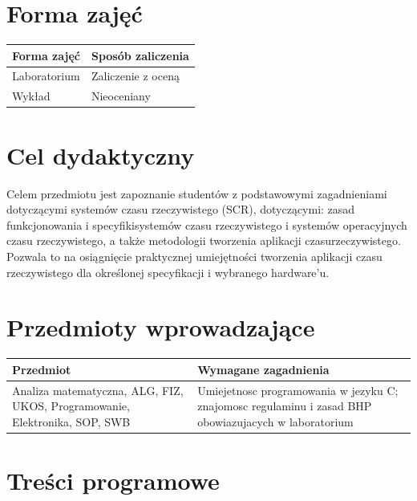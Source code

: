 \documentclass[12pt, a4paper]{article}
\begin{document}
\section{Forma zajęć}

\begin{tabular}{ll}
  \hline
  \textbf{Forma zajęć} & \textbf{Sposób zaliczenia} \\
  \hline
  Laboratorium & Zaliczenie z oceną \\
  Wykład & Nieoceniany \\
  \hline
\end{tabular}

\section{Cel dydaktyczny}

Celem przedmiotu jest zapoznanie studentów z podstawowymi zagadnieniami dotyczącymi systemów czasu rzeczywistego (SCR), dotyczącymi: zasad funkcjonowania i specyfikisystemów czasu rzeczywistego i systemów operacyjnych czasu rzeczywistego, a także metodologii tworzenia aplikacji czasurzeczywistego. Pozwala to na osiągnięcie praktycznej umiejętności tworzenia aplikacji czasu rzeczywistego dla określonej specyfikacji i wybranego hardware’u.

\section{Przedmioty wprowadzające}

\begin{tabularx}{\textwidth}{lX}
  \hline
  \textbf{Przedmiot} & \textbf{Wymagane zagadnienia} \\
  \hline
  Analiza matematyczna, ALG, FIZ, UKOS, Programowanie, Elektronika, SOP, SWB & Umiejetnosc programowania w jezyku C; znajomosc regulaminu i zasad BHP obowiazujacych w laboratorium \\
  \hline
\end{tabularx}

\section{Treści programowe}
\end{document}
